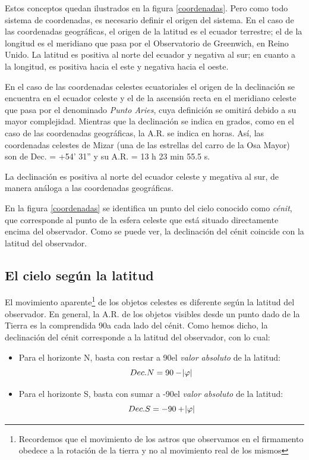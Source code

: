\documentclass[12pt]{memoir}
\begin{document}
Estos conceptos quedan ilustrados en la figura \ref{coordenadas}. Pero como todo sistema de coordenadas, es necesario definir el origen del sistema. En el caso de las coordenadas geográficas, el origen de la latitud es el ecuador terrestre; el de la longitud es el meridiano que pasa por el Observatorio de Greenwich, en Reino Unido. La latitud es positiva al norte del ecuador y negativa al sur; en cuanto a la longitud, es positiva hacia el este y negativa hacia el oeste.

En el caso de las coordenadas celestes ecuatoriales el origen de la declinación se encuentra en el ecuador celeste y el de la ascensión recta en el meridiano celeste que pasa por el denominado \textit{Punto Aries}, cuya definición se omitirá debido a su mayor complejidad. Mientras que la declinación se indica en grados, como en el caso de las coordenadas geográficas, la A.R. se indica en horas. Así, las coordenadas celestes de Mizar (una de las estrellas del carro de la Osa Mayor) son de Dec. = +54' 31'' y su A.R. = 13 h 23 min 55.5 s. 

La declinación es positiva al norte del ecuador celeste y megativa al sur, de manera análoga a las coordenadas geográficas.

En la figura \ref{coordenadas} se identifica un punto del cielo conocido como \textit{cénit}, que corresponde al punto de la esfera celeste que está situado directamente encima del observador. Como se puede ver, la declinación del cénit coincide con la latitud del observador.

\subsection{El cielo según la latitud}


El movimiento aparente\footnote{Recordemos que el movimiento de los astros que observamos en el firmamento obedece a la rotación de la tierra y no al movimiento real de los mismos} de los objetos celestes es diferente según la latitud del observador. En general, la A.R. de los objetos visibles desde un punto dado de la Tierra es la comprendida 90\textdegree a cada lado del cénit. Como hemos dicho, la declinación del cénit corresponde a la latitud del observador, con lo cual:

\begin{itemize}
 \item Para el horizonte N, basta con restar a 90\textdegree el \textit{valor absoluto} de la latitud: 
 \[Dec. N = 90 - \abs{\varphi}\]
 \item Para el horizonte S, basta con sumar a -90\textdegree el \textit{valor absoluto} de la latitud:
 \[Dec. S = -90 + \abs{\varphi}\]
\end{itemize}
\end{document}
